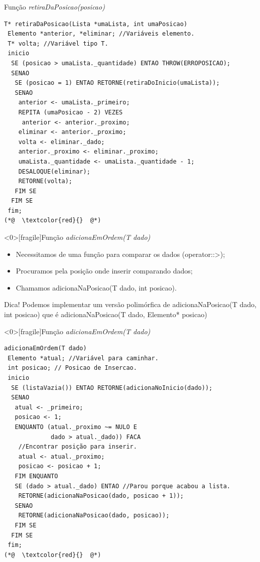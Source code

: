 \documentclass[12pt,table,xcolor={dvipsnames}]{beamer}
\begin{document}
\begin{frame}[fragile]{Função \textit{retiraDaPosicao(posicao)}}
\begin{lstlisting}
T* retiraDaPosicao(Lista *umaLista, int umaPosicao)
 Elemento *anterior, *eliminar; //Variáveis elemento.
 T* volta; //Variável tipo T.
 inicio
  SE (posicao > umaLista._quantidade) ENTAO THROW(ERROPOSICAO);
  SENAO
   SE (posicao = 1) ENTAO RETORNE(retiraDoInicio(umaLista));
   SENAO
    anterior <- umaLista._primeiro;
    REPITA (umaPosicao - 2) VEZES
     anterior <- anterior._proximo;
    eliminar <- anterior._proximo;
    volta <- eliminar._dado;
    anterior._proximo <- eliminar._proximo;
    umaLista._quantidade <- umaLista._quantidade - 1;
    DESALOQUE(eliminar);
    RETORNE(volta);
   FIM SE
  FIM SE
 fim;
(*@  \textcolor{red}{}  @*)
\end{lstlisting}
\end{frame}


\begin{frame}<0>[fragile]{Função \textit{adicionaEmOrdem(T dado)}}
\begin{itemize}
\item Necessitamos de uma função para comparar os dados (operator::>);
\item Procuramos pela posição onde inserir comparando dados;
\item Chamamos adicionaNaPosicao(T dado, int posicao).
\end{itemize}
\begin{block}{Dica!}
Podemos implementar um versão polimórfica de adicionaNaPosicao(T dado, int posicao) que é adicionaNaPosicao(T dado, Elemento* posicao)
\end{block}
\end{frame}

\begin{frame}<0>[fragile]{Função \textit{adicionaEmOrdem(T dado)}}
\begin{lstlisting}
adicionaEmOrdem(T dado)
 Elemento *atual; //Variável para caminhar.
 int posicao; // Posicao de Insercao.
 inicio
  SE (listaVazia()) ENTAO RETORNE(adicionaNoInicio(dado));
  SENAO
   atual <- _primeiro;
   posicao <- 1;
   ENQUANTO (atual._proximo ~= NULO E
             dado > atual._dado)) FACA 
    //Encontrar posição para inserir.
    atual <- atual._proximo;
    posicao <- posicao + 1;
   FIM ENQUANTO
   SE (dado > atual._dado) ENTAO //Parou porque acabou a lista.
    RETORNE(adicionaNaPosicao(dado, posicao + 1));
   SENAO
    RETORNE(adicionaNaPosicao(dado, posicao));
   FIM SE
  FIM SE
 fim;
(*@  \textcolor{red}{}  @*)
\end{lstlisting}
\end{frame}
\end{document}
